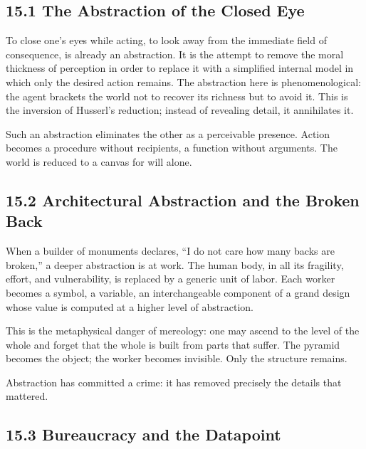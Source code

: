 \documentclass[12pt,letterpaper]{article}
\theoremstyle{remark}
\begin{document}
\subsection{15.1 The Abstraction of the Closed Eye}

To close one’s eyes while acting, to look away from the immediate field of consequence, is already an abstraction. It is the attempt to remove the moral thickness of perception in order to replace it with a simplified internal model in which only the desired action remains. The abstraction here is phenomenological: the agent brackets the world not to recover its richness but to avoid it. This is the inversion of Husserl’s reduction; instead of revealing detail, it annihilates it.

Such an abstraction eliminates the other as a perceivable presence. Action becomes a procedure without recipients, a function without arguments. The world is reduced to a canvas for will alone.

\subsection{15.2 Architectural Abstraction and the Broken Back}

When a builder of monuments declares, ``I do not care how many backs are broken,'' a deeper abstraction is at work. The human body, in all its fragility, effort, and vulnerability, is replaced by a generic unit of labor. Each worker becomes a symbol, a variable, an interchangeable component of a grand design whose value is computed at a higher level of abstraction.

This is the metaphysical danger of mereology: one may ascend to the level of the whole and forget that the whole is built from parts that suffer. The pyramid becomes the object; the worker becomes invisible. Only the structure remains.

Abstraction has committed a crime: it has removed precisely the details that mattered.

\subsection{15.3 Bureaucracy and the Datapoint}
\end{document}

